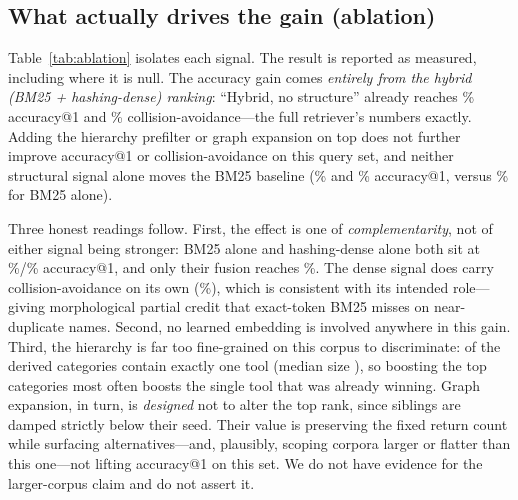 \documentclass[11pt]{article}
\begin{document}
\begin{table}[h]
\centering
\caption{Flat BM25 baseline vs.\ the full OKTS retriever on \numTools{} tools,
\numQueries{} labeled queries, $k=\kval$. Token cost is per query.}
\label{tab:main}

\end{table}

\subsection{What actually drives the gain (ablation)}

Table~\ref{tab:ablation} isolates each signal. The result is reported as
measured, including where it is null. The accuracy gain comes \emph{entirely from
the hybrid (BM25 + hashing-dense) ranking}: ``Hybrid, no structure'' already
reaches \hybridBareAccOne\% accuracy@1 and \hybridBareColl\%
collision-avoidance---the full retriever's numbers exactly. Adding the hierarchy
prefilter or graph expansion on top does not further improve accuracy@1 or
collision-avoidance on this query set, and neither structural signal alone moves
the BM25 baseline (\bmHierAccOne\% and \bmGraphAccOne\% accuracy@1, versus
\flatAccOne\% for BM25 alone).

Three honest readings follow. First, the effect is one of \emph{complementarity},
not of either signal being stronger: BM25 alone and hashing-dense alone both sit
at \flatAccOne\%/\denseAccOne\% accuracy@1, and only their fusion reaches
\hybridBareAccOne\%. The dense signal does carry collision-avoidance on its own
(\denseColl\%), which is consistent with its intended role---giving morphological
partial credit that exact-token BM25 misses on near-duplicate names. Second, no
learned embedding is involved anywhere in this gain. Third, the hierarchy is far
too fine-grained on this corpus to discriminate: \numSingletonCategories{} of the
\numCategories{} derived categories contain exactly one tool (median size
\medianCategorySize{}), so boosting the top \hierTopCats{} categories most often
boosts the single tool that was already winning. Graph expansion, in turn, is
\emph{designed} not to alter the top rank, since siblings are damped strictly
below their seed. Their value is preserving the fixed return count while
surfacing alternatives---and, plausibly, scoping corpora larger or flatter than
this one---not lifting accuracy@1 on this set. We do not have evidence for the
larger-corpus claim and do not assert it.

\begin{table}[h]
\centering
\caption{Ablation. The accuracy gain is attributable to hybrid ranking; the
structural signals are accuracy-neutral here (see text).}
\label{tab:ablation}

\end{table}
\end{document}
